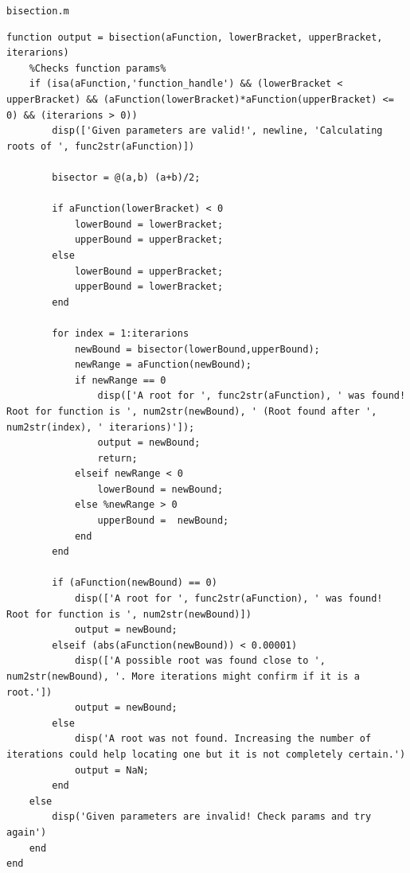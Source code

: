 \documentclass[english,notitlepage,letterpaper, 10pt]{article} %
\begin{document}
\hspace{0.5cm}\texttt{bisection.m}
\begin{lstlisting}
function output = bisection(aFunction, lowerBracket, upperBracket, iterarions)
    %Checks function params%
    if (isa(aFunction,'function_handle') && (lowerBracket < upperBracket) && (aFunction(lowerBracket)*aFunction(upperBracket) <= 0) && (iterarions > 0))
        disp(['Given parameters are valid!', newline, 'Calculating roots of ', func2str(aFunction)])

        bisector = @(a,b) (a+b)/2;
        
        if aFunction(lowerBracket) < 0
            lowerBound = lowerBracket;
            upperBound = upperBracket;
        else
            lowerBound = upperBracket;
            upperBound = lowerBracket;
        end
        
        for index = 1:iterarions
            newBound = bisector(lowerBound,upperBound);
            newRange = aFunction(newBound);
            if newRange == 0
                disp(['A root for ', func2str(aFunction), ' was found! Root for function is ', num2str(newBound), ' (Root found after ', num2str(index), ' iterarions)']);
                output = newBound;
                return;
            elseif newRange < 0
                lowerBound = newBound;
            else %newRange > 0
                upperBound =  newBound;
            end
        end

        if (aFunction(newBound) == 0)
            disp(['A root for ', func2str(aFunction), ' was found! Root for function is ', num2str(newBound)])
            output = newBound;
        elseif (abs(aFunction(newBound)) < 0.00001)
            disp(['A possible root was found close to ', num2str(newBound), '. More iterations might confirm if it is a root.'])
            output = newBound;
        else
            disp('A root was not found. Increasing the number of iterations could help locating one but it is not completely certain.')
            output = NaN;
        end
    else 
        disp('Given parameters are invalid! Check params and try again')
    end
end
\end{lstlisting}
\end{document}
